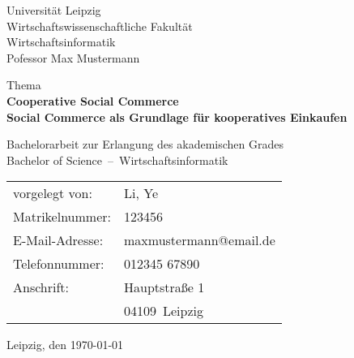 
\newcommand{\trtitleone}{Cooperative Social Commerce}
\newcommand{\trtitletwo}{Social Commerce als Grundlage für kooperatives Einkaufen}
\newcommand{\trtype}{Bachelorarbeit zur Erlangung des akademischen Grades}
\newcommand{\trabschluss}{Bachelor of Science}
\newcommand{\trauthor}{Li, Ye}
\newcommand{\trstrasse}{Hauptstraße 1}
\newcommand{\trmatrikelnummer}{123456}
\newcommand{\trplz}{04109}
\newcommand{\trort}{Leipzig}
\newcommand{\tremail}{maxmustermann@email.de}
\newcommand{\trtelefon}{012345 67890}
\newcommand{\truni}{Universität Leipzig}
\newcommand{\trfakultaet}{Wirtschaftswissenschaftliche Fakultät}
\newcommand{\trfachbereich}{Wirtschaftsinformatik}
\newcommand{\trstudiengang}{Wirtschaftsinformatik}
\newcommand{\trprofessor}{Pofessor Max Mustermann}

\newcommand{\trdate}{\today}

\thispagestyle{empty}

\truni\\
\trfakultaet\\
\trfachbereich\\
\trprofessor

\vspace{3cm}

\begin{center}
	Thema\\[1cm]
	\textbf{\LARGE \trtitleone}\\[0.1cm]
	\textbf{\large \trtitletwo}
\end{center}

\vspace{0.2cm}

\begin{center}
  \trtype \\
  \trabschluss~--~\trstudiengang \\
\end{center}

\vfill

\begin{table}[htbp]
\begin{tabular}{l l}
vorgelegt von: & \trauthor \\
Matrikelnummer: & \trmatrikelnummer \\
E-Mail-Adresse: & \tremail \\
Telefonnummer: & \trtelefon \\
Anschrift: & \trstrasse \\
& \trplz~\trort \\
\end{tabular}
\end{table}

\vspace{0.25cm}

\trort, den \today

